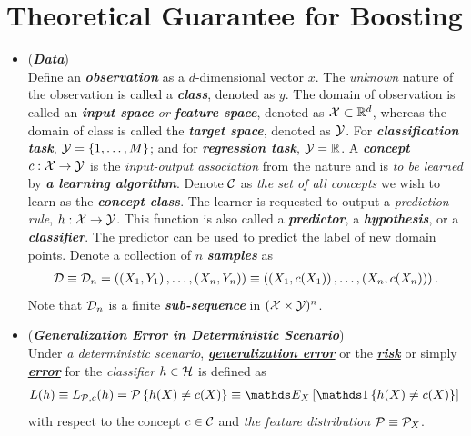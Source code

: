 \documentclass[11pt]{article}
\begin{document}
\section{Theoretical Guarantee for Boosting}
\begin{itemize}
\item \begin{remark} (\emph{\textbf{Data}})\\
Define an \emph{\textbf{observation}} as a $d$-dimensional vector $x$. The \emph{unknown} nature of the observation is called a \emph{\textbf{class}}, denoted as $y$. The domain of observation is called an \emph{\textbf{input space} or \textbf{feature space}}, denoted as ${\mathcal X}\subset {\mathbb R}^{d}$, whereas the domain of class is called the \emph{\textbf{target space}}, denoted as ${\mathcal Y}$. For \emph{\textbf{classification task}}, ${\mathcal Y}= \left\{1,\ldots, M\right\}$; and for \emph{\textbf{regression task}}, ${\mathcal Y} = {\mathbb R}$.   A \emph{\textbf{concept}} $c: {\mathcal X} \rightarrow {\mathcal Y}$ is the \emph{input-output association} from the nature and is \emph{to be learned} by \emph{\textbf{a learning algorithm}}.  Denote ${\mathcal C}$ as \emph{the set of all concepts} we wish to learn as the \emph{\textbf{concept class}}. The learner is requested to output a \emph{prediction rule}, $h : {\mathcal X} \to {\mathcal Y}$. This function is also called a \emph{\textbf{predictor}}, a \emph{\textbf{hypothesis}}, or a \emph{\textbf{classifier}}. The predictor can be used to predict the label of new domain points.  Denote a collection of $n$ \emph{\textbf{samples}} as 
\begin{align*}
{\mathcal D} \equiv {\mathcal D}_n = \left((X_1, Y_1) \,{,}\ldots{,}\, (X_n, Y_n)\right) \equiv  \left((X_1, c(X_1)) \,{,}\ldots{,}\, (X_n, c(X_n))\right) .
\end{align*} Note that ${\mathcal D}_n$ is a finite \emph{\textbf{sub-sequence}} in $({\mathcal X} \times {\mathcal Y})^n$.
\end{remark}

\item \begin{definition} (\emph{\textbf{Generalization Error in Deterministic Scenario}})  \citep{mohri2018foundations}\\
Under \emph{a deterministic scenario}, \underline{\emph{\textbf{generalization error}}} or the \underline{\emph{\textbf{risk}}} or simply \underline{\emph{\textbf{error}}} for the \emph{classifier} $h \in {\mathcal H}$ is defined as
\begin{align}
L(h) \equiv L_{\cP, c}(h)  &= \cP\set{h(X) \neq c(X)} \equiv \E{X}{\ind{h(X)\neq c(X)}}\label{expr: gen_err_determin}
\end{align}
with respect to the concept $c \in {\mathcal C}$ and \emph{the feature distribution} ${\mathcal P} \equiv {\mathcal P}_X$.
\end{definition}


\end{itemize}
\end{document}
